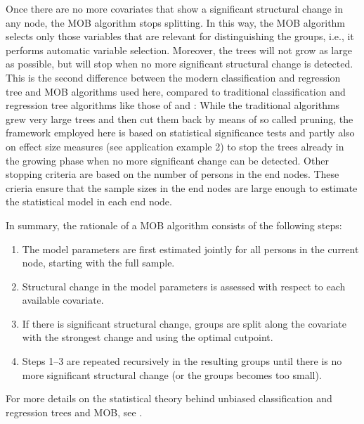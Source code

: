 \documentclass[doc,floatsintext,natbib]{apa7}
\begin{document}
Once there are no more covariates that show a significant structural change in any node, the MOB algorithm stops splitting. In this way, the MOB algorithm selects only those variables that are relevant for distinguishing the groups, i.e., it performs automatic variable selection. Moreover, the trees will not grow as large as possible, but will stop when no more significant structural change is detected. This is the second difference between the modern classification and regression tree and MOB algorithms used here, compared to traditional classification and regression tree algorithms like those of \citet{Breetal:1984} and \citet{Qui:1993}: While the traditional algorithms grew very large trees and then cut them back by means of so called pruning, the framework employed here is based on statistical significance tests and partly also on effect size measures (see application example 2) to stop the trees already in the growing phase when no more significant change can be detected. Other stopping criteria are based on the number of persons in the end nodes. These crieria ensure that the sample sizes in the end nodes are large enough to estimate the statistical model in each end node.

In summary, the rationale of a MOB algorithm consists of the following steps:

\begin{enumerate}
\item The model parameters are first estimated jointly for all persons in the current node, starting with the full sample.
\item Structural change in the model parameters is assessed with respect to each available covariate.
\item If there is significant structural change, groups are split along the covariate with the strongest change and using the optimal cutpoint.
\item Steps 1--3 are repeated recursively in the resulting groups until there is no more significant structural change (or the groups becomes too small).
\end{enumerate}

For more details on the statistical theory behind unbiased classification and regression trees and MOB, see \citet{Hotetal:2006,StrMalTut:2009:PM,StroyKopf15}.  
\end{document}
